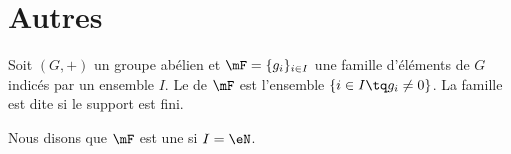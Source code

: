 \section{Autres}

Soit \( (G,+)\) un groupe abélien et \( \mF=\{ g_i \}_{i\in I}\) une famille d'éléments de \( G\) indicés par un ensemble \( I\). Le  de \( \mF\) est l'ensemble \( \{ i\in I\tq g_i\neq 0 \}\). La famille est dite  si le support est fini.

Nous disons que \( \mF\) est une  si \( I=\eN\).
